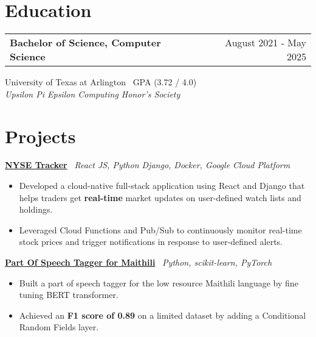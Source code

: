 \documentclass[a4paper,12pt]{article}
\begin{document}
\vspace{-0.6em}
\section{Education}
\noindent
\begin{tabularx}{\linewidth}{@{}Xr@{}}
\textbf{Bachelor of Science, Computer Science} & August 2021 - May 2025 \\
\end{tabularx}
\vspace{0.2em}
University of Texas at Arlington \ GPA (3.72 / 4.0) \\
\textit{Upsilon Pi Epsilon Computing Honor's Society}

\vspace{-0.6em}
\section{Projects}

\vspace{-0.4em}
\href{https://github.com/kilibarda4/nyse-tracker}
{\textbf{NYSE Tracker}} \ \textit{React JS, Python Django, Docker, Google Cloud Platform}
\begin{itemize}
\vspace{-0.4em}
    \item Developed a cloud-native full-stack application using React and Django that helps traders get \textbf{real-time} market updates on user-defined watch lists and holdings.
    \item Leveraged Cloud Functions and Pub/Sub to continuously monitor real-time stock prices and trigger notifications in response to user-defined alerts.
\end{itemize}

\vspace{-0.4em}
\href{https://github.com/kilibarda4/pos-tagger-Maithili}
{\textbf{Part Of Speech Tagger for Maithili}} \ \textit{Python, scikit-learn, PyTorch}
\begin{itemize}
\vspace{-0.4em}
    \item Built a part of speech tagger for the low resource Maithili language by fine tuning BERT transformer.
    \item Achieved an \textbf{F1 score of 0.89} on a limited dataset by adding a Conditional Random Fields layer.
\end{itemize}

\vfill
\end{document}
